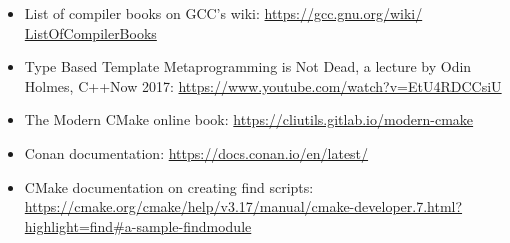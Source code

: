 \begin{itemize}
\item
List of compiler books on GCC's wiki: \url{https://gcc.gnu.org/wiki/
ListOfCompilerBooks}

\item
Type Based Template Metaprogramming is Not Dead, a lecture by Odin Holmes, C++Now 2017: \url{https://www.youtube.com/watch?v=EtU4RDCCsiU}

\item
The Modern CMake online book: \url{https://cliutils.gitlab.io/modern-cmake}

\item
Conan documentation: \url{https://docs.conan.io/en/latest/}

\item
CMake documentation on creating find scripts: \url{https://cmake.org/cmake/help/v3.17/manual/cmake-developer.7.html?highlight=find#a-sample-findmodule}
\end{itemize}